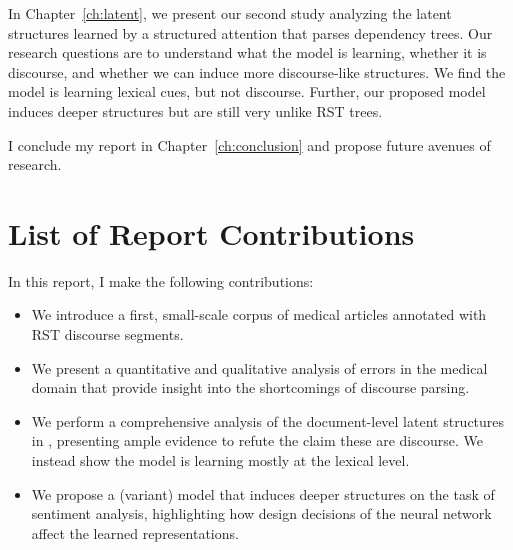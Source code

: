 In Chapter~\ref{ch:latent}, we present our second study analyzing the latent structures learned by a structured attention that parses dependency trees. Our research questions are to understand what the model is learning, whether it is discourse, and whether we can induce more discourse-like structures. We find the model is learning lexical cues, but not discourse. Further, our proposed model induces deeper structures but are still very unlike RST trees.

I conclude my report in Chapter~\ref{ch:conclusion} and propose future avenues of research.

\section{List of Report Contributions}

\noindent In this report, I make the following contributions:

\begin{itemize}
\item We introduce a first, small-scale corpus of medical articles annotated with RST discourse segments.
\item We present a quantitative and qualitative analysis of errors in the medical domain that provide insight into the shortcomings of discourse parsing.
\item We perform a comprehensive analysis of the document-level latent structures in , presenting ample evidence to refute the claim these are discourse. We instead show the model is learning mostly at the lexical level.
\item We propose a (variant) model that induces deeper structures on the task of sentiment analysis, highlighting how design decisions of the neural network affect the learned representations.
\end{itemize}

